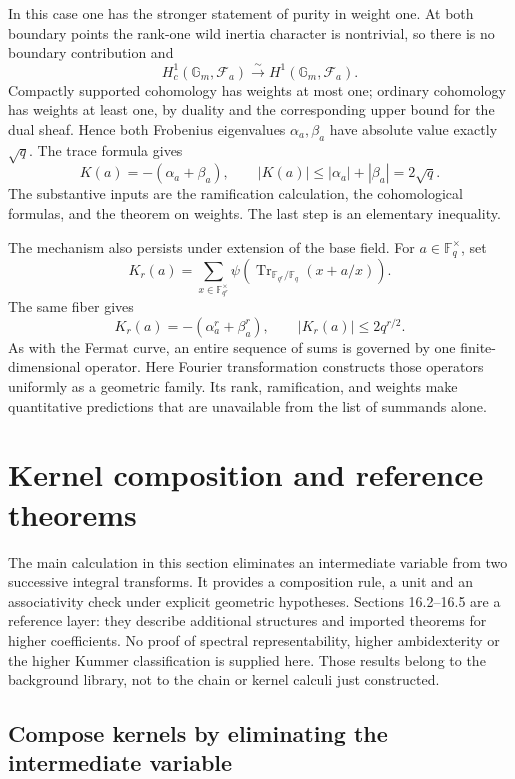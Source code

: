 \documentclass[11pt]{article}
\theoremstyle{remark}
\begin{document}
In this case one has the stronger statement of purity in weight one. At both boundary points the rank-one wild inertia character is nontrivial, so there is no boundary contribution and
\[
H_c^1(\mathbb G_m,\mathcal F_a)
\overset{\sim}{\longrightarrow}
H^1(\mathbb G_m,\mathcal F_a).
\]
Compactly supported cohomology has weights at most one; ordinary cohomology has weights at least one, by duality and the corresponding upper bound for the dual sheaf. Hence both Frobenius eigenvalues \(\alpha_a,\beta_a\) have absolute value exactly \(\sqrt q\). The trace formula gives
\[
K(a)=-(\alpha_a+\beta_a),\qquad
|K(a)|\le|\alpha_a|+|\beta_a|=2\sqrt q.
\]
The substantive inputs are the ramification calculation, the cohomological formulas, and the theorem on weights. The last step is an elementary inequality.

The mechanism also persists under extension of the base field. For \(a\in\mathbb F_q^\times\), set
\[
K_r(a)=\sum_{x\in\mathbb F_{q^r}^\times}
\psi\!\left(\operatorname{Tr}_{\mathbb F_{q^r}/\mathbb F_q}
(x+a/x)\right).
\]
The same fiber gives
\begin{equation}
K_r(a)=-(\alpha_a^r+\beta_a^r),\qquad
|K_r(a)|\le2q^{r/2}.
\label{estimate:extensions}
\end{equation}
As with the Fermat curve, an entire sequence of sums is governed by one finite-dimensional operator. Here Fourier transformation constructs those operators uniformly as a geometric family. Its rank, ramification, and weights make quantitative predictions that are unavailable from the list of summands alone.

\section{Kernel composition and reference theorems}
\label{higher:section}

The main calculation in this section eliminates an intermediate variable from two successive integral transforms. It provides a composition rule, a unit and an associativity check under explicit geometric hypotheses. Sections 16.2--16.5 are a reference layer: they describe additional structures and imported theorems for higher coefficients. No proof of spectral representability, higher ambidexterity or the higher Kummer classification is supplied here. Those results belong to the background library, not to the chain or kernel calculi just constructed.

\subsection{Compose kernels by eliminating the intermediate variable}
\label{kernel-composition-calculus}
\end{document}
